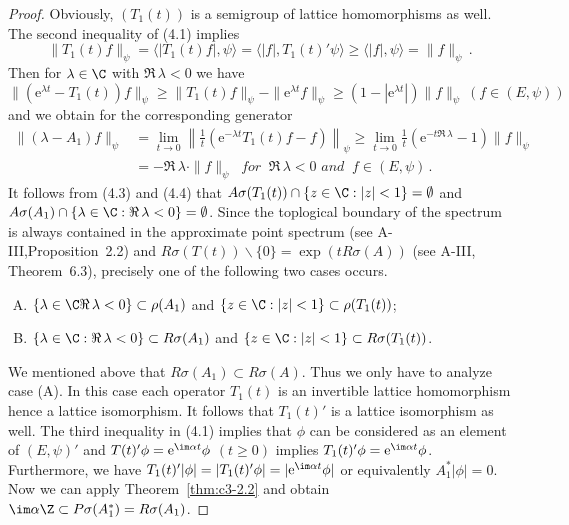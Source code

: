 \begin{proof}
	Obviously, $(T_{1}(t))$ is a semigroup of lattice homomorphisms as well. 
	The second inequality of (4.1) implies
	\begin{equation}\label{eq:c3-4.3}
	\|T_{1}(t)f\|_{\psi} = \langle|T_{1}(t)f|,\psi\rangle = \langle|f|,T_{1}(t)'\psi\rangle \geq \langle|f|,\psi\rangle = \|f\|_{\psi}\,.
	\end{equation}
	Then for $\lambda \in \C $ with $\Re\,\lambda < 0$ we have 
	\[ 
	\|(\mathrm{e}^{\lambda t}-T_{1}(t))f\|_{\psi} \geq \|T_{1}(t)f\|_{\psi}-\|\mathrm{e}^{\lambda t}f\|_{\psi} \geq (1-|\mathrm{e}^{\lambda t}|)\|f\|_{\psi} \ (f \in (E,\psi))
	\]
	and we obtain for the corresponding generator
	\begin{equation}\label{eq:c3-4.4}
		\begin{aligned}
		\|(\lambda-A_{1})f\|_{\psi} &= \lim_{t \to 0}\left\|\frac{1}{t}(\mathrm{e}^{-\lambda t}T_{1}(t)f-f)\right\|_{\psi} \geq \lim_{t \to 0}\frac{1}{t}(\mathrm{e}^{-t\Re\,\lambda}-1)\|f\|_{\psi}\\
		&= -\Re\,\lambda\cdot\|f\|_{\psi} \ \textit{ for } \ \Re\,\lambda < 0 \textit{ and } \ f \in (E,\psi)\,.
		\end{aligned}
	\end{equation}
	It follows from (4.3) and (4.4) that $A\sigma(T_{1}(t))\cap\{z \in \C  : |z| < 1\} = \emptyset$ and $A\sigma(A_{1})\cap\{\lambda \in \C  : \Re\,\lambda < 0\} = \emptyset$. 
	Since the toplogical boundary of the spectrum is always contained in the approximate point spectrum (see A-III,Proposition~2.2) and $R\sigma(T(t))\backslash\{0\} = \exp(tR\sigma(A))$ (see A-III, Theorem~6.3), precisely one of the following two cases occurs.
	\begin{enumerate}[(A)]
		\item
		$\{\lambda \in \C   \Re\,\lambda < 0\} \subset \rho(A_{1})$ and $\{z \in \C  : |z| < 1\} \subset \rho(T_{1}(t))$;
		
		\item
		$\{\lambda \in \C  : \Re\,\lambda < 0\} \subset R\sigma(A_{1})$ and $\{z \in \C  : |z| < 1\} \subset R\sigma(T_{1}(t))$.
	\end{enumerate}
	
	We mentioned above that $R\sigma(A_{1}) \subset R\sigma(A)$. 
	Thus we only have to analyze case (A). 
	In this case each operator $T_{1}(t)$ is an invertible lattice homomorphism hence a lattice isomorphism. 
	It follows that $T_{1}(t)'$ is a lattice isomorphism as well. 
	The third inequality in (4.1) implies that $\phi$ can be considered as an element of $(E,\psi)'$ and $T(t)'\phi = \mathrm{e}^{\im\alpha t}\phi$ $(t \geq 0)$ implies $T_{1}(t)'\phi = \mathrm{e}^{\im\alpha t}\phi$. 
	Furthermore, we have
	$T_{1}(t)'|\phi| = |T_{1}(t)'\phi| = |\mathrm{e}^{\im\alpha t}\phi|$ or equivalently $A_{1}^*|\phi| = 0$.
	Now we can apply 
	Theorem~\ref{thm:c3-2.2} 
	and obtain $\im\alpha\Z \subset P\sigma(A_{1}^*) = R\sigma(A_{1})$.
	\end{proof}

